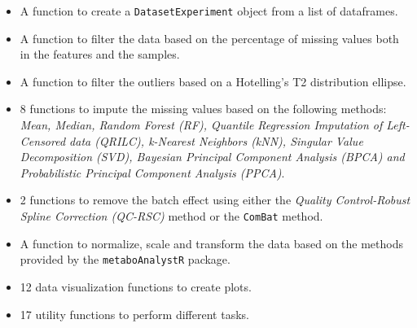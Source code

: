 \documentclass[ENG, BIB]{TFUOC}%
\begin{document}
\begin{itemize}
    \item A function to create a \texttt{DatasetExperiment} object from a list of dataframes.
    \item A function to filter the data based on the percentage of missing values both in the features and the samples.
    \item A function to filter the outliers based on a Hotelling's T2 distribution ellipse.
    \item 8 functions to impute the missing values based on the following methods: \textit{Mean, Median, Random Forest (RF), Quantile Regression Imputation of Left-Censored data (QRILC), k-Nearest Neighbors (kNN), Singular Value Decomposition (SVD), Bayesian Principal Component Analysis (BPCA) and Probabilistic Principal Component Analysis (PPCA)}.
    \item 2 functions to remove the batch effect using either the \textit{Quality Control-Robust Spline Correction (QC-RSC)} method or the \texttt{ComBat} method. 
    \item A function to normalize, scale and transform the data based on the methods provided by the \texttt{metaboAnalystR} package.
    \item 12 data visualization functions to create plots.
    \item 17 utility functions to perform different tasks.
\end{itemize}
\end{document}
